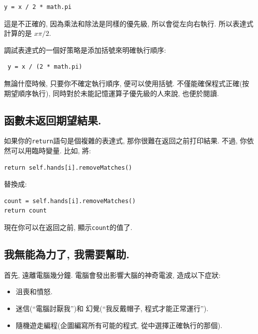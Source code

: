 \documentclass[10pt]{book}
\begin{document}
\begin{verbatim}
y = x / 2 * math.pi
\end{verbatim}
%
這是不正確的, 因為乘法和除法是同樣的優先級, 所以會從左向右執行. 
所以表達式計算的是 $x \pi / 2$.

調試表達式的一個好策略是添加括號來明確執行順序:

\begin{verbatim}
 y = x / (2 * math.pi)
\end{verbatim}
%
無論什麼時候, 只要你不確定執行順序, 便可以使用括號. 
不僅能確保程式正確(按期望順序執行), 同時對於未能記憶運算子優先級的人來說, 
也便於閱讀. 


\subsection{函數未返回期望結果.}

如果你的{\tt return}語句是個複雜的表達式, 
那你很難在返回之前打印結果. 
不過, 你依然可以用臨時變量. 
比如, 將:

\begin{verbatim}
return self.hands[i].removeMatches()
\end{verbatim}
%
替換成:

\begin{verbatim}
count = self.hands[i].removeMatches()
return count
\end{verbatim}
%
現在你可以在返回之前, 顯示{\tt count}的值了.


\subsection{我無能為力了, 我需要幫助.}

首先, 遠離電腦幾分鐘. 
電腦會發出影響大腦的神奇電波, 造成以下症狀:

\begin{itemize}

\item 沮喪和憤怒.

\item 迷信(``電腦討厭我'')和
幻覺(``我反戴帽子, 程式才能正常運行'').

\item 隨機遊走編程(企圖編寫所有可能的程式, 從中選擇正確執行的那個).

\end{itemize}
\end{document}
